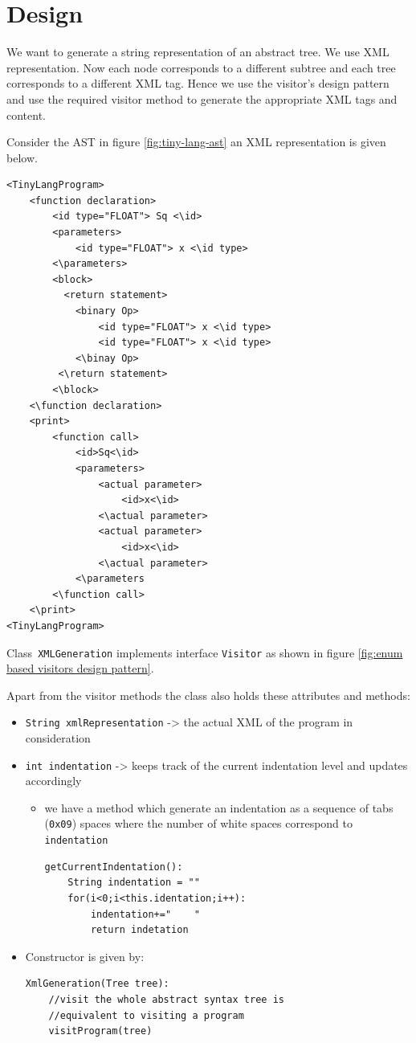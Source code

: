 \section{Design}
\label{sec:design task 3}
We want to generate a string representation of an abstract tree. We use XML representation. Now each node corresponds to a different subtree and each tree corresponds to a different XML tag. Hence we use the visitor's design pattern and use the required visitor method to generate the appropriate XML tags and content.

Consider the AST in figure \ref{fig:tiny-lang-ast} an XML representation is given below.
\begin{lstlisting}[caption=XML representation of AST shown in figure \ref{fig:tiny-lang-ast}]
<TinyLangProgram>
    <function declaration>
        <id type="FLOAT"> Sq <\id>
        <parameters>
            <id type="FLOAT"> x <\id type>
        <\parameters>
        <block>
          <return statement>
            <binary Op>
                <id type="FLOAT"> x <\id type>
                <id type="FLOAT"> x <\id type>
            <\binay Op>
         <\return statement>
        <\block>
    <\function declaration>
    <print>
        <function call>
            <id>Sq<\id>
            <parameters>
                <actual parameter>
                    <id>x<\id>
                <\actual parameter>
                <actual parameter>
                    <id>x<\id>
                <\actual parameter>
            <\parameters
        <\function call>
    <\print>
<TinyLangProgram>
\end{lstlisting}

Class\verb! XMLGeneration! implements interface \verb!Visitor! as shown in figure \ref{fig:enum based visitors design pattern}.


Apart from the visitor methods the class also holds  these attributes and methods:
\begin{itemize}
    \item \verb!String xmlRepresentation! -> the actual XML of the program in consideration
    \item \verb!int indentation! -> keeps track of the current indentation level and updates accordingly
    \begin{itemize}
        \item we have a method which generate an indentation as a sequence of tabs (\verb!0x09!) spaces where the number of white spaces correspond to \verb!indentation! 
\begin{lstlisting}[caption=Get current indentation]
getCurrentIndentation():
    String indentation = ""
    for(i<0;i<this.identation;i++):
        indentation+="    "
        return indetation
\end{lstlisting}
    \end{itemize}
    \item Constructor is given by:
\begin{lstlisting}[caption=XmlGeneration Constructor]
XmlGeneration(Tree tree):
    //visit the whole abstract syntax tree is 
    //equivalent to visiting a program
    visitProgram(tree)
\end{lstlisting}
\end{itemize}
